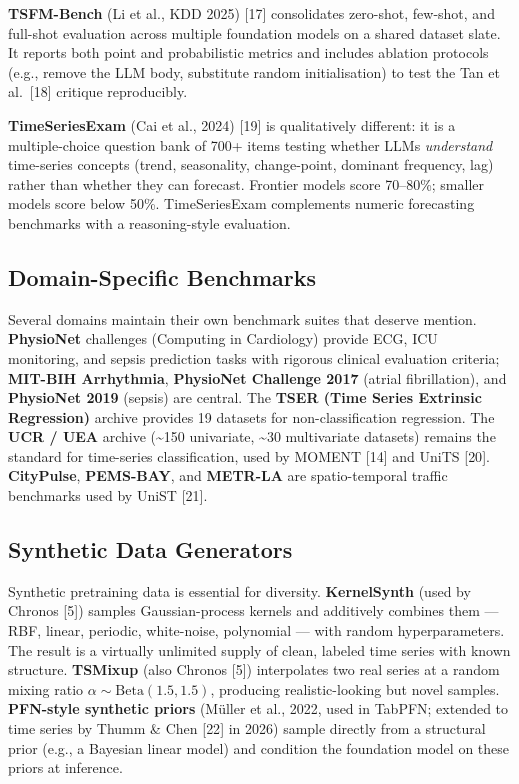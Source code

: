 \textbf{TSFM-Bench} (Li et al., KDD 2025) {[}17{]} consolidates zero-shot, few-shot, and full-shot evaluation across multiple foundation models on a shared dataset slate. It reports both point and probabilistic metrics and includes ablation protocols (e.g., remove the LLM body, substitute random initialisation) to test the Tan et al.~{[}18{]} critique reproducibly.

\textbf{TimeSeriesExam} (Cai et al., 2024) {[}19{]} is qualitatively different: it is a multiple-choice question bank of 700+ items testing whether LLMs \emph{understand} time-series concepts (trend, seasonality, change-point, dominant frequency, lag) rather than whether they can forecast. Frontier models score 70--80\%; smaller models score below 50\%. TimeSeriesExam complements numeric forecasting benchmarks with a reasoning-style evaluation.

\subsection{Domain-Specific Benchmarks}\label{domain-specific-benchmarks}

Several domains maintain their own benchmark suites that deserve mention. \textbf{PhysioNet} challenges (Computing in Cardiology) provide ECG, ICU monitoring, and sepsis prediction tasks with rigorous clinical evaluation criteria; \textbf{MIT-BIH Arrhythmia}, \textbf{PhysioNet Challenge 2017} (atrial fibrillation), and \textbf{PhysioNet 2019} (sepsis) are central. The \textbf{TSER (Time Series Extrinsic Regression)} archive provides 19 datasets for non-classification regression. The \textbf{UCR / UEA} archive (\textasciitilde150 univariate, \textasciitilde30 multivariate datasets) remains the standard for time-series classification, used by MOMENT {[}14{]} and UniTS {[}20{]}. \textbf{CityPulse}, \textbf{PEMS-BAY}, and \textbf{METR-LA} are spatio-temporal traffic benchmarks used by UniST {[}21{]}.

\subsection{Synthetic Data Generators}\label{synthetic-data-generators}

Synthetic pretraining data is essential for diversity. \textbf{KernelSynth} (used by Chronos {[}5{]}) samples Gaussian-process kernels and additively combines them --- RBF, linear, periodic, white-noise, polynomial --- with random hyperparameters. The result is a virtually unlimited supply of clean, labeled time series with known structure. \textbf{TSMixup} (also Chronos {[}5{]}) interpolates two real series at a random mixing ratio \(\alpha \sim \mathrm{Beta}(1.5, 1.5)\), producing realistic-looking but novel samples. \textbf{PFN-style synthetic priors} (Müller et al., 2022, used in TabPFN; extended to time series by Thumm \& Chen {[}22{]} in 2026) sample directly from a structural prior (e.g., a Bayesian linear model) and condition the foundation model on these priors at inference.

